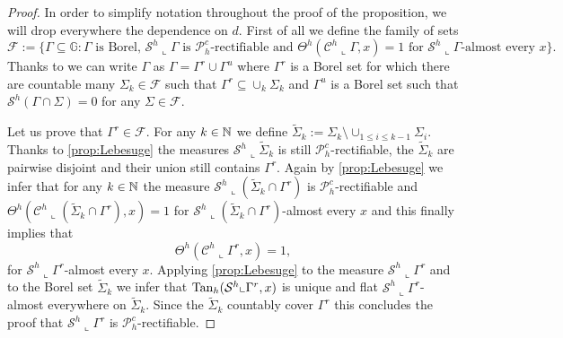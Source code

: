 \documentclass[10pt, a4paper,
oneside, headinclude,footinclude]{scrartcl}
\begin{document}
\begin{proof} 
In order to simplify notation throughout the proof of the proposition, we will drop everywhere the dependence on $d$.
First of all we define the family of sets
$$
\mathscr{F}:=\{\Gamma\subseteq \mathbb{G}:\Gamma\text{ is Borel, }\mathcal{S}^h\llcorner \Gamma\text{ is $\mathscr{P}_h^c$-rectifiable and $\Theta^h(\mathcal{C}^h\llcorner \Gamma,x)=1$ for $\mathcal{S}^h\llcorner \Gamma$-almost every $x$}\}.
$$
Thanks to \cite[Proposition 1.22]{MarstrandMattila20} we can write $\Gamma$ as $\Gamma=\Gamma^r\cup \Gamma^u$ where $\Gamma^r$ is a Borel set for which there are countable many $\Sigma_k\in\mathscr{F}$ such that $\Gamma^r\subseteq \cup_k\Sigma_k$ and $\Gamma^u$ is a Borel set such that $\mathcal{S}^h(\Gamma\cap \Sigma)=0$ for any $\Sigma\in\mathscr{F}$.

Let us prove that $\Gamma^r\in\mathscr{F}$. For any $k\in\mathbb{N}$ we define $\tilde \Sigma_k:=\Sigma_k\setminus \cup_{1\leq i\leq k-1}\Sigma_i$. Thanks to \cref{prop:Lebesuge} the measures $\mathcal{S}^h\llcorner \tilde\Sigma_k$ is still $\mathscr{P}_h^c$-rectifiable, the $\tilde\Sigma_k$ are pairwise disjoint and their union still contains $\Gamma^r$. Again by \cref{prop:Lebesuge} we infer that for any $k\in \mathbb{N}$ the measure $\mathcal{S}^h\llcorner (\tilde\Sigma_k\cap \Gamma^r)$ is $\mathscr{P}_h^c$-rectifiable and $\Theta^h(\mathcal{C}^h\llcorner  (\tilde\Sigma_k\cap \Gamma^r),x)=1$ for $\mathcal{S}^h\llcorner  (\tilde\Sigma_k\cap \Gamma^r)$-almost every $x$ and this finally implies that
$$\Theta^h(\mathcal{C}^h\llcorner  \Gamma^r,x)=1,$$
for $\mathcal{S}^h\llcorner  \Gamma^r$-almost every $x$. Applying \cref{prop:Lebesuge} to the measure $\mathcal{S}^h\llcorner  \Gamma^r$ and to the Borel set $\tilde \Sigma_k$ we infer that $\mathrm{Tan}_h(\mathcal{S}^h\llcorner  \Gamma^r,x)$ is unique and flat $\mathcal{S}^h\llcorner  \Gamma^r$-almost everywhere on $\tilde \Sigma_k$. Since the $\tilde\Sigma_k$ countably cover $\Gamma^r$ this concludes the proof that $\mathcal{S}^h\llcorner \Gamma^r$ is $\mathscr{P}_h^c$-rectifiable.
 \medskip
 

\end{proof}
\end{document}
